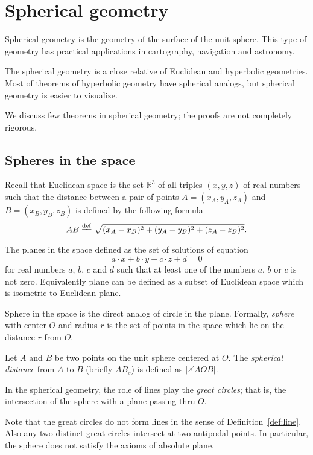 \chapter{Spherical geometry}
\label{chap:sphere}

Spherical geometry is the geometry 
of the surface of the unit sphere.
This type of geometry has practical  applications in cartography, navigation  and astronomy.

The spherical geometry is a close relative of Euclidean and hyperbolic geometries.
Most of theorems of hyperbolic geometry have spherical analogs,
but spherical geometry is easier to visualize. 

We discuss few theorems in spherical geometry;
the proofs are not completely rigorous.

\section*{Spheres in the space}

Recall that Euclidean space is the set $\mathbb{R}^3$ of all triples $(x,y,z)$ of real numbers
such that the distance between a pair of points
$A=(x_A,y_A,z_A)$ and $B=(x_B,y_B,z_B)$
is defined by the following formula
$$AB
\df
\sqrt{(x_A-x_B)^2+(y_A-y_B)^2+(z_A-z_B)^2}.$$

The planes in the space defined as the set of solutions of equation 
$$a\cdot x+b\cdot y+c\cdot z+d=0$$ 
for real numbers $a$, $b$, $c$ and $d$ such that at least one of the numbers $a$, $b$ or $c$ is not zero.
Equivalently plane can be defined as a subset of Euclidean space which is isometric to Euclidean plane.

Sphere in the space is the direct analog of circle in the plane.
Formally, \emph{sphere} with center $O$ and radius $r$ is the set of points in the space which lie on the distance $r$ from $O$.

Let $A$ and $B$ be two points on the unit sphere centered at $O$.
The \emph{spherical distance} from $A$ to $B$
(briefly $AB_s$)
 is defined as  $|\measuredangle AOB|$. 

In the spherical geometry, the role of lines play the \emph{great circles};
that is, the intersection of the sphere with a plane passing thru $O$.


Note that the great circles do not form lines in the sense of Definition~\ref{def:line}.
Also any two distinct great circles intersect at two antipodal points.
In particular, the sphere does not satisfy the axioms of absolute plane.







